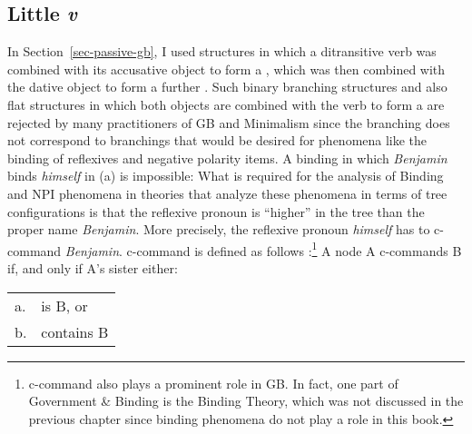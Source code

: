 \subsection{Little \textit{v}}
\label{sec-little-v}

In Section~\ref{sec-passive-gb}, I used \xbar structures in which a ditransitive verb was combined
with its accusative object to form a \vbar, which was then combined with the dative object to form a
further \vbar. Such binary branching structures and also flat structures in which both objects are
combined with the verb to form a \vbar are rejected by many practitioners of GB and Minimalism since
the branching does not correspond to branchings that would be desired for phenomena like the binding
of reflexives and negative polarity items. A binding in which \emph{Benjamin} binds \emph{himself}
in (a) is impossible:
\eal
{}
\zl
What is required for the analysis of Binding and NPI phenomena in theories that analyze these
phenomena in terms of tree configurations is that the reflexive pronoun is ``higher'' in the tree than
the proper name \emph{Benjamin}. More precisely, the reflexive pronoun \emph{himself} has to
c-command \emph{Benjamin}. c-command is defined as follows \citep[]{Adger2003a}:\footnote{%
  c-command also plays a prominent role in GB. In fact, one part of Government \& Binding is the
  Binding Theory, which was not discussed in the previous chapter since binding phenomena do not
  play a role in this book.
}
\ea
A node A c-commands B if, and only if A's sister either:\\
\begin{tabular}[t]{@{}l@{~}l@{}}
a. & is B, or\\
b. & contains B
\end{tabular}
\z

